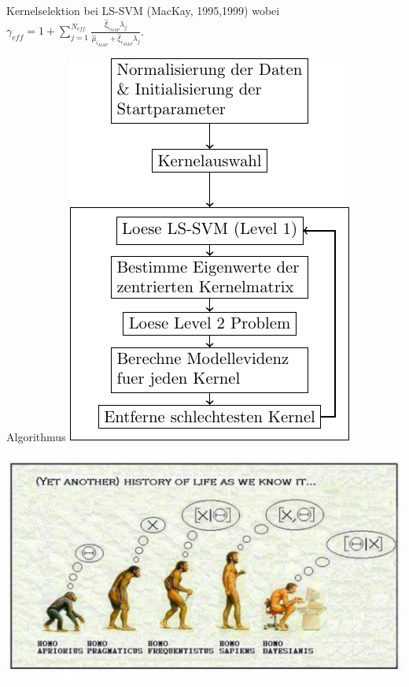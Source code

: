\documentclass{beamer}
\begin{document}
{\begin{frame}
\begin{block}{Kernelselektion bei LS-SVM (MacKay, 1995,1999)}
wobei $\gamma_{eff} = 1 + \sum_{j=1}^{N_{eff}}\frac{\hat{\xi}_{i_{MAP}}\lambda_j}{\hat{\mu}_{i_{MAP}} + \hat{\xi}_{i_{MAP}}\lambda_j}$.

\end{block}

\end{frame}






\begin{frame}{Algorithmus}
	\centering\includegraphics[scale=0.9]{Algo.pdf}
\end{frame}

\begin{frame}
	\centering\includegraphics[scale=0.7]{humanshistory.pdf}
\end{frame}


}
\end{document}
